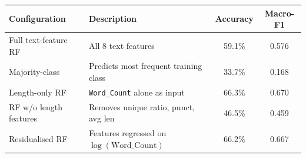 \begin{tabular}{@{}lp{6.2cm}cc@{}}
\toprule
Configuration & Description & Accuracy & Macro-F1 \\
\midrule
Full text-feature RF & All 8 text features & 59.1\% & 0.576 \\
Majority-class & Predicts most frequent training class & 33.7\% & 0.168 \\
Length-only RF & \texttt{Word\_Count} alone as input & 66.3\% & 0.670 \\
RF w/o length features & Removes unique ratio, punct, avg len & 46.5\% & 0.459 \\
Residualised RF & Features regressed on $\log(\text{Word\_Count})$ & 66.2\% & 0.667 \\
\bottomrule
\end{tabular}